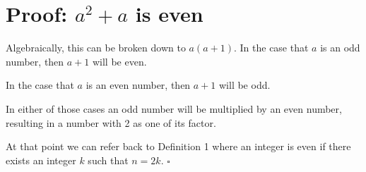 \documentclass[12pt]{article}
\begin{document}
\section*{Proof: $a^{2} + a$ is even}
Algebraically, this can be broken down to $a(a + 1)$. In the case that
$a$ is an odd number, then $a + 1$ will be even.

In the case that $a$ is an even number, then $a + 1$ will be odd.

In either of those cases an odd number will be multiplied by an even
number, resulting in a number with 2 as one of its factor.

At that point we can refer back to Definition 1 where an integer is
even  if there exists an integer $k$ such that $n = 2k$. $\square$
\end{document}
